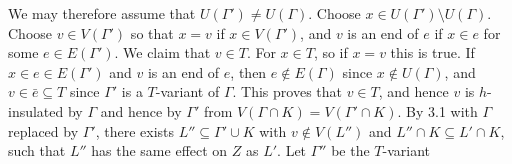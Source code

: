 We may therefore assume that $U(\Gamma') \ne U(\Gamma)$. Choose $x \in U(\Gamma') \setminus U(\Gamma)$. Choose $v \in V(\Gamma')$ so that $x = v$ if $x \in V(\Gamma')$, and $v$ is an end of $e$ if $x \in e$ for some $e \in E(\Gamma')$. We claim that $v \in T$. For $x \in T$, so if $x = v$ this is true. If $x \in e \in E(\Gamma')$ and $v$ is an end of $e$, then $e \notin E(\Gamma)$ since $x \notin U(\Gamma)$, and $v \in \bar{e} \subseteq T$ since $\Gamma'$ is a $T$-variant of $\Gamma$. This proves that $v \in T$, and hence $v$ is $h$-insulated by $\Gamma$ and hence by $\Gamma'$ from $V(\Gamma \cap K) = V(\Gamma' \cap K)$. By 3.1 with $\Gamma$ replaced by $\Gamma'$, there exists $L'' \subseteq \Gamma' \cup K$ with $v \notin V(L'')$ and $L'' \cap K \subseteq L' \cap K$, such that $L''$ has the same effect on $Z$ as $L'$. Let $\Gamma''$ be the $T$-variant
